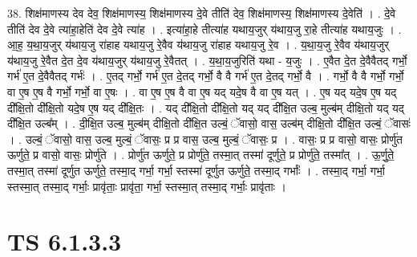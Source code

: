 \documentclass[17pt]{extarticle}
\begin{document}
38. शिक्ष॑माणस्य देव देव॒ शिक्ष॑माणस्य॒ शिक्ष॑माणस्य दे॒वे तीति॑ देव॒ शिक्ष॑माणस्य॒ शिक्ष॑माणस्य दे॒वेति॑ । . दे॒वे तीति॑ देव दे॒वे त्या॑हा॒हेति॑ देव दे॒वे त्या॑ह । . इत्या॑हा॒हे तीत्या॑ह यथाय॒जुर् य॑थाय॒जु रा॒हे तीत्या॑ह यथाय॒जुः । . आ॒ह॒ य॒था॒य॒जुर् य॑थाय॒जु रा॑हाह यथाय॒जु रे॒वैव य॑थाय॒जु रा॑हाह यथाय॒जु रे॒व । . य॒था॒य॒जु रे॒वैव य॑थाय॒जुर् य॑थाय॒जु रे॒वैत दे॒त दे॒व य॑थाय॒जुर् य॑थाय॒जु रे॒वैतत् । . य॒था॒य॒जुरिति॑ यथा - य॒जुः । . ए॒वैत दे॒त दे॒वैवैतद् गर्भो॒ गर्भ॑ ए॒त दे॒वैवैतद् गर्भः॑ । . ए॒तद् गर्भो॒ गर्भ॑ ए॒त दे॒तद् गर्भो॒ वै वै गर्भ॑ ए॒त दे॒तद् गर्भो॒ वै । . गर्भो॒ वै वै गर्भो॒ गर्भो॒ वा ए॒ष ए॒ष वै गर्भो॒ गर्भो॒ वा ए॒षः । . वा ए॒ष ए॒ष वै वा ए॒ष यद् यदे॒ष वै वा ए॒ष यत् । . ए॒ष यद् यदे॒ष ए॒ष यद् दी᳚क्षि॒तो दी᳚क्षि॒तो यदे॒ष ए॒ष यद् दी᳚क्षि॒तः । . यद् दी᳚क्षि॒तो दी᳚क्षि॒तो यद् यद् दी᳚क्षि॒त उल्ब॒ मुल्ब॑म् दीक्षि॒तो यद् यद् दी᳚क्षि॒त उल्ब᳚म् । . दी॒क्षि॒त उल्ब॒ मुल्ब॑म् दीक्षि॒तो दी᳚क्षि॒त उल्बं॒ ॅवासो॒ वास॒ उल्ब॑म् दीक्षि॒तो दी᳚क्षि॒त उल्बं॒ ॅवासः॑ । . उल्बं॒ ॅवासो॒ वास॒ उल्ब॒ मुल्बं॒ ॅवासः॒ प्र प्र वास॒ उल्ब॒ मुल्बं॒ ॅवासः॒ प्र । . वासः॒ प्र प्र वासो॒ वासः॒ प्रोर्णु॑त ऊर्णुते॒ प्र वासो॒ वासः॒ प्रोर्णु॑ते । . प्रोर्णु॑त ऊर्णुते॒ प्र प्रोर्णु॑ते॒ तस्मा॒त् तस्मा॑ दूर्णुते॒ प्र प्रोर्णु॑ते॒ तस्मा᳚त् । . ऊ॒र्णु॒ते॒ तस्मा॒त् तस्मा॑ दूर्णुत ऊर्णुते॒ तस्मा॒द् गर्भा॒ गर्भा॒ स्तस्मा॑ दूर्णुत ऊर्णुते॒ तस्मा॒द् गर्भाः᳚ । . तस्मा॒द् गर्भा॒ गर्भा॒ स्तस्मा॒त् तस्मा॒द् गर्भाः॒ प्रावृ॑ताः॒ प्रावृ॑ता॒ गर्भा॒ स्तस्मा॒त् तस्मा॒द् गर्भाः॒ प्रावृ॑ताः । \newline
\pagebreak
{}

\section{ TS 6.1.3.3 }
\end{document}
